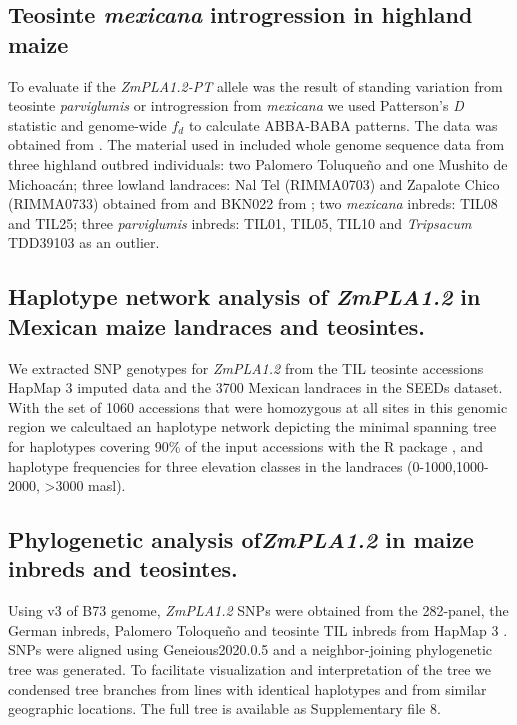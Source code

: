 \documentclass[9pt,twocolumn,twoside,lineno]{BioRxiv}
\begin{document}
\subsection{Teosinte \textit{mexicana} introgression in highland maize}
To evaluate if the \textit{ZmPLA1.2-PT} allele was the result of standing variation from teosinte \textit{parviglumis} or introgression from \textit{mexicana} we used Patterson's \textit{D} statistic and genome-wide $f_{d}$ to calculate ABBA-BABA patterns. 
The data was obtained from \cite{Gonzalez-Segovia2019-jy}. 
The material used in \cite{Gonzalez-Segovia2019-jy} included whole genome sequence data from three highland outbred individuals: two Palomero Toluqueño and one Mushito de Michoacán; three lowland landraces: Nal Tel (RIMMA0703) and Zapalote Chico (RIMMA0733) obtained from \cite{Wang2017-bc} and  BKN022 from \cite{Bukowski2017-ng}; two \textit{mexicana} inbreds: TIL08 and TIL25; three \textit{parviglumis} inbreds: TIL01, TIL05, TIL10 and \textit{Tripsacum} TDD39103 \cite{Bukowski2017-ng} as an outlier. 

\subsection{Haplotype network analysis of \textit{ZmPLA1.2} in Mexican maize landraces and teosintes.}
We extracted SNP genotypes for \textit{ZmPLA1.2} from the TIL teosinte accessions HapMap 3 imputed data \cite{Bukowski2017-ng} and the 3700 Mexican landraces in the SEEDs dataset. 
With the set of 1060 accessions that were homozygous at all sites in this genomic region we calcultaed an haplotype network depicting the minimal spanning tree for haplotypes covering 90\% of the input accessions with the R package  \cite{paradis2010}, and haplotype frequencies for three elevation classes in the landraces (0-1000,1000-2000, >3000 masl).

\subsection{Phylogenetic analysis of\textit{ZmPLA1.2} in maize inbreds and teosintes.}
Using v3 of B73 genome, \textit{ZmPLA1.2} SNPs were obtained from the 282-panel, the German inbreds, Palomero Toloqueño and teosinte TIL inbreds from HapMap 3 \cite{Bukowski2017-ng}. 
SNPs were aligned using Geneious2020.0.5 and a neighbor-joining phylogenetic tree was generated. 
To facilitate visualization and interpretation of the tree we condensed tree branches from lines with identical haplotypes and from similar geographic locations. 
The full tree is available as Supplementary file 8. 
\end{document}
